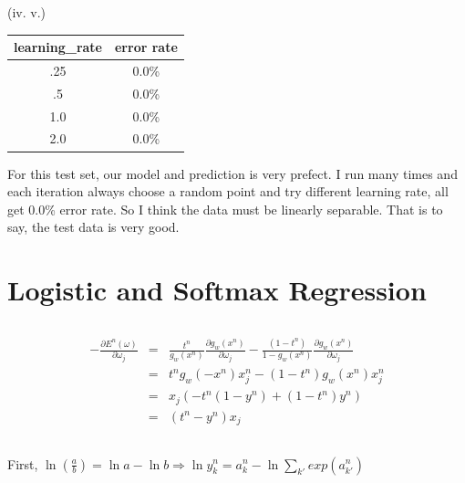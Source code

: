 \documentclass{article} %
\begin{document}
(iv. v.) \\

\begin{center}

\begin{tabular}{ | c | c |}
  \hline			
  learning\_rate & error rate\\ \hline
  .25 & 0.0\% \\ \hline
  .5 & 0.0\% \\ \hline
  1.0 & 0.0\% \\ \hline
  2.0 & 0.0\% \\ \hline
\end{tabular}

\end{center}

For this test set, our model and prediction is very prefect. I run many times and each iteration always choose a random point and try different learning rate, all get 0.0\% error rate. So I think the data must be linearly separable. That is to say, the test data is very good.


\section{Logistic and Softmax Regression}

\subsection{}
\begin{equation}
    \begin{array}{rcl}
      	 - \frac{\partial{E^n(\omega)}}{\partial{\omega_j}} & = & \frac{t^n}{g_w(x^n)} \frac{\partial{g_w(x^n)}}{\partial \omega_j} - \frac{(1 - t^n)}{1 - g_w(x^n)} \frac{\partial{g_w(x^n)}}{\partial \omega_j} \\
	& = & t^n g_w(-x^n) x_j^n - (1 - t^n) g_w(x^n) x_j^n \\
	& = & x_j (-t^n(1 - y^n) + (1 - t^n)y^n)\\
	& = & (t^n - y^n)x_j
    \end{array}
\end{equation}

\subsection{}

First, 
$ \ln(\frac{a}{b}) = \ln{a} - \ln{b} \Rightarrow \ln{y_k^n} = a_k^n - \ln{\sum_{k'} exp(a_{k'}^n)}$
\end{document}

